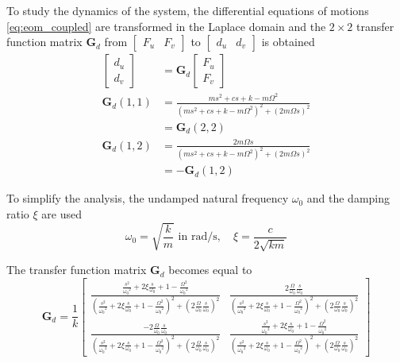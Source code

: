 \documentclass[Afour,sagev,times]{sagej}
\begin{document}
\par
To study the dynamics of the system, the differential equations of motions \eqref{eq:eom_coupled} are transformed in the Laplace domain and the \(2 \times 2\) transfer function matrix \(\bm{G}_d\) from \(\begin{bmatrix}F_u & F_v\end{bmatrix}\) to \(\begin{bmatrix}d_u & d_v\end{bmatrix}\) is obtained
\begin{align}
  \begin{bmatrix} d_u \\ d_v \end{bmatrix} &= \bm{G}_d \begin{bmatrix} F_u \\ F_v \end{bmatrix} \label{eq:Gd_mimo_tf} \\
  \bm{G}_{d}(1,1) &= \frac{ms^2 + cs + k - m \Omega^2}{\left( m s^2 + cs + k - m \Omega^2 \right)^2 + \left( 2 m \Omega s \right)^2} \\
                  &= \bm{G}_{d}(2,2) \nonumber \\
  \bm{G}_{d}(1,2) &= \frac{2 m \Omega s}{\left( m s^2 + cs + k - m \Omega^2 \right)^2 + \left( 2 m \Omega s \right)^2} \\
                  &= -\bm{G}_{d}(1,2) \nonumber
\end{align}

To simplify the analysis, the undamped natural frequency \(\omega_0\) and the damping ratio \(\xi\) are used
\begin{equation}
  \omega_0 = \sqrt{\frac{k}{m}} \text{ in } \si{\radian\per\second}, \quad \xi = \frac{c}{2 \sqrt{k m}}
\end{equation}

The transfer function matrix \(\bm{G}_d\) becomes equal to
\begin{equation}
\label{eq:Gd_w0_xi_k}
\bm{G}_{d} =
  \frac{1}{k}
  \begin{bmatrix}
    \frac{\frac{s^2}{{\omega_0}^2} + 2 \xi \frac{s}{\omega_0} + 1 - \frac{{\Omega}^2}{{\omega_0}^2}}{\left( \frac{s^2}{{\omega_0}^2} + 2 \xi \frac{s}{\omega_0} + 1 - \frac{{\Omega}^2}{{\omega_0}^2} \right)^2 + \left( 2 \frac{\Omega}{\omega_0} \frac{s}{\omega_0} \right)^2} & \frac{2 \frac{\Omega}{\omega_0} \frac{s}{\omega_0}}{\left( \frac{s^2}{{\omega_0}^2} + 2 \xi \frac{s}{\omega_0} + 1 - \frac{{\Omega}^2}{{\omega_0}^2} \right)^2 + \left( 2 \frac{\Omega}{\omega_0} \frac{s}{\omega_0} \right)^2} \\
    \frac{- 2 \frac{\Omega}{\omega_0} \frac{s}{\omega_0}}{\left( \frac{s^2}{{\omega_0}^2} + 2 \xi \frac{s}{\omega_0} + 1 - \frac{{\Omega}^2}{{\omega_0}^2} \right)^2 + \left( 2 \frac{\Omega}{\omega_0} \frac{s}{\omega_0} \right)^2} & \frac{\frac{s^2}{{\omega_0}^2} + 2 \xi \frac{s}{\omega_0} + 1 - \frac{{\Omega}^2}{{\omega_0}^2}}{\left( \frac{s^2}{{\omega_0}^2} + 2 \xi \frac{s}{\omega_0} + 1 - \frac{{\Omega}^2}{{\omega_0}^2} \right)^2 + \left( 2 \frac{\Omega}{\omega_0} \frac{s}{\omega_0} \right)^2}
  \end{bmatrix}
\end{equation}
\end{document}
